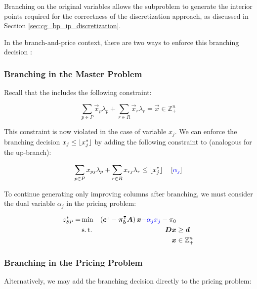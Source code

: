 \begin{note}
Branching on the original variables allows the subproblem to generate the interior points required for the correctness of the discretization approach, as discussed in Section \ref{sec:cg_bp_ip_discretization}.
\end{note}

In the branch-and-price context, there are two ways to enforce this branching decision \cite{thebook}:

\subsubsection{Branching in the Master Problem}
Recall that the \MP{} includes the following constraint:

\begin{equation}
\sum_{p \in P} \vec{x}_p \lambda_p + \sum_{r \in R} \vec{x}_r \lambda_r = \vec{x} \in \mathbb{Z}_+^n
\end{equation}

This constraint is now violated in the case of variable $x_j$. We can enforce the branching decision $x_j \leq \lfloor x_j^*\rfloor$ by adding the following constraint to \MP{} (analogous for the up-branch):

\begin{equation}
\sum_{p \in P} x_{pj} \lambda_p + \sum_{r \in R} x_{rj} \lambda_r \leq \lfloor x_j^*\rfloor \quad \left[{\color{blue} \alpha_j }\right]
\end{equation}

To continue generating only improving columns after branching, we must consider the dual variable $\alpha_j$ in the pricing problem:

\begin{equation}
\begin{aligned}
z^*_\SP{} = &\min & \left( \vec{c}\transpose - \vec{\pi}_\vec{b}\transpose \mat{A} \right) \vec{x} {\color{blue} - \alpha_j x_j} - \pi_0 & \\
&\st & \mat{D} \vec{x} & \geq \vec{d} \\
&& \vec{x} & \in \mathbb{Z}_+^n
\end{aligned}
\end{equation}

\subsubsection{Branching in the Pricing Problem}
Alternatively, we may add the branching decision directly to the pricing problem:

